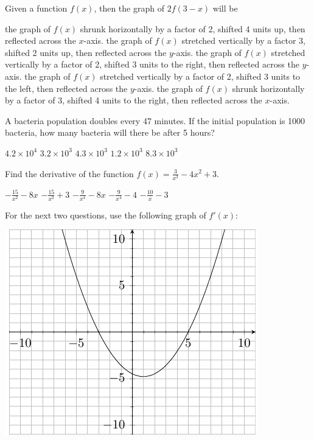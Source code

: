 \documentclass[11pt]{article}
\begin{document}
\begin{questions}
\begin{multiplechoice}{5}
\question Given a function $f(x)$, then the graph of $2f\left(3 - x\right)$ will be
\begin{answers}{2}
\ans the graph of $f(x)$ shrunk horizontally by a factor of 2, shifted 4 units up, then reflected across the $x$-axis.
\ans the graph of $f(x)$ stretched vertically by a factor 3, shifted 2 units up, then reflected across the $y$-axis.
\ans the graph of $f(x)$ stretched vertically by a factor of 2, shifted 3 units to the right, then reflected across the $y$-axis.
\ans the graph of $f(x)$ stretched vertically by a factor of 2, shifted 3 units to the left, then reflected across the $y$-axis.
\ans the graph of $f(x)$ shrunk horizontally by a factor of 3, shifted 4 units to the right, then reflected across the $x$-axis.
\end{answers}



\question A bacteria population doubles every 47 minutes.  If the initial population is 1000 bacteria, how many bacteria will there be after 5 hours?
\begin{answers}{3}
\ans $4.2 \times 10^4$
\ans $3.2 \times 10^3$
\ans $4.3 \times 10^3$
\ans $1.2 \times 10^3$
\ans $8.3 \times 10^3$
\end{answers}



\question Find the derivative of the function $f(x) = \frac{3}{x^3} - 4x^2 + 3$.
\begin{answers}{2}
\ans $-\frac{15}{x^2} - 8x$
\ans $-\frac{15}{x^2} + 3$
\ans $-\frac{9}{x^4} -8x$
\ans $-\frac{9}{x^4} - 4$
\ans $-\frac{10}{x} - 3$
\end{answers}

\newpage


For the next two questions, use the following graph of $f'(x)$:\\


\begin{minipage}{\linewidth}%
\centering
\makebox[\linewidth]{}
\includegraphics{finalgraph3.pdf}
\label{graph1exam1}%
\end{minipage}



\end{multiplechoice}
\end{questions}
\end{document}
